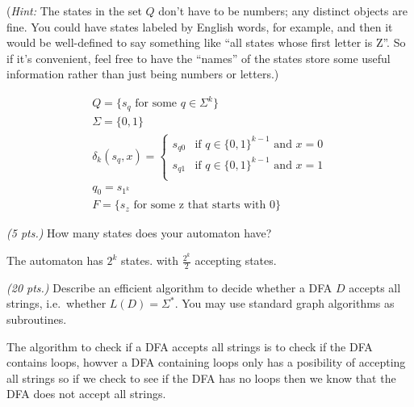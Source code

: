 \documentclass[11pt]{article}
\begin{document}
\begin{qunlist}
\begin{qparts}
    (\emph{Hint:} The states in the set $Q$ don't have to be numbers; any distinct objects are fine. You could have states labeled by English words, for example, and then it would be well-defined to say something like ``all states whose first letter is Z''. So if it's convenient, feel free to have the ``names'' of the states store some useful information rather than just being numbers or letters.)
    \begin{solution}
      \begin{gather}
        Q = \{s_q \mbox{ for some } q \in \Sigma^k\}\\
        \Sigma = \{0,1\}\\
        \delta_k(s_q,x) = \begin{cases}
          s_{q0} & \mbox{if }q\in\{0,1\}^{k-1} \mbox{ and } x = 0 \\
          s_{q1} & \mbox{if }q\in\{0,1\}^{k-1} \mbox{ and } x = 1 \\
        \end{cases}\\
        q_0 = s_{1^k}\\
        F = \{s_z \mbox{ for some z that starts with 0}\}
      \end{gather}
    \end{solution}
    \item \emph{(5 pts.)}
    How many states does your automaton have?
    \begin{solution}
      The automaton has $2^k$ states. with $\frac{2^k}2$ accepting states.
    \end{solution}
  \end{qparts}

  \newpage

  \begin{qparts}
    \item \emph{(20 pts.)}
    Describe an efficient algorithm to decide whether a DFA $D$ accepts all strings, i.e.~whether $L(D) = \Sigma^*$.
    You may use standard graph algorithms as subroutines.
    \begin{solution}
      The algorithm to check if a DFA accepts all strings is to check if the DFA contains loops, howver a DFA containing loops only has a posibility of accepting all strings so if we check to see if the DFA has no loops then we know that the DFA does not accept all strings.
    \end{solution}


\end{qparts}
\end{qunlist}
\end{document}
